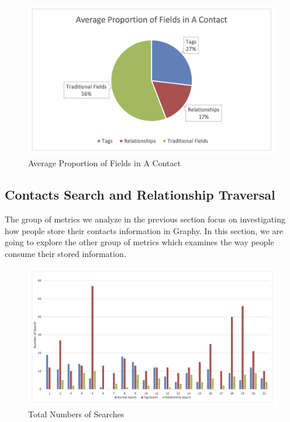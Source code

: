 \begin{figure}[!h]
\begin{centering}
\includegraphics[scale=0.7]{pics/average_contact_fields.png}
\caption{Average Proportion of Fields in A Contact}\label{fig:average_contact_fields}
\end{centering}
\end{figure}

\subsection{Contacts Search and Relationship Traversal}\label{results_search}

The group of metrics we analyze in the previous section focus on investigating how people store their contacts information in Graphy. In this section, we are going to explore the other group of metrics which examines the way people consume their stored information.

\begin{figure}[!h]
\begin{centering}
\includegraphics[scale=0.7]{pics/search_total.png}
\caption{Total Numbers of Searches}\label{fig:search_total}
\end{centering}
\end{figure}

